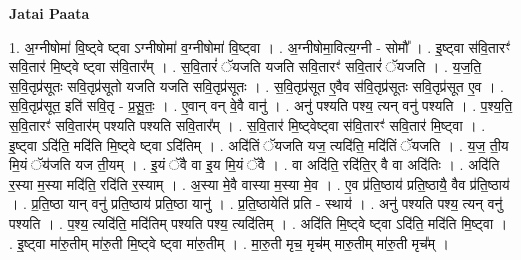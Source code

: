 \documentclass[17pt]{extarticle}
\begin{document}
\textbf{Jatai Paata} \newline

1. अ॒ग्नीषोमा॑ वि॒ष्ट्वे ष्ट्वा ऽग्नीषोमा॑ व॒ग्नीषोमा॑ वि॒ष्ट्वा । . अ॒ग्नीषोमा॒वित्य॒ग्नी - सोमौ᳚ । . इ॒ष्ट्वा स॑वि॒तारꣳ॑ सवि॒तार॑ मि॒ष्ट्वे ष्ट्वा स॑वि॒तार᳚म् । . स॒वि॒तारं॑ ॅयजति यजति सवि॒तारꣳ॑ सवि॒तारं॑ ॅयजति । . य॒ज॒ति॒ स॒वि॒तृप्र॑सूतः सवि॒तृप्र॑सूतो यजति यजति सवि॒तृप्र॑सूतः । . स॒वि॒तृप्र॑सूत ए॒वैव स॑वि॒तृप्र॑सूतः सवि॒तृप्र॑सूत ए॒व । . स॒वि॒तृप्र॑सूत॒ इति॑ सवि॒तृ - प्र॒सू॒तः॒ । . ए॒वान् वन् वे॒वै वानु॑ । . अनु॑ पश्यति पश्य॒ त्यन् वनु॑ पश्यति । . प॒श्य॒ति॒ स॒वि॒तारꣳ॑ सवि॒तार॑म् पश्यति पश्यति सवि॒तार᳚म् । . स॒वि॒तार॑ मि॒ष्ट्वेष्ट्वा स॑वि॒तारꣳ॑ सवि॒तार॑ मि॒ष्ट्वा । . इ॒ष्ट्वा ऽदि॑ति॒ मदि॑ति मि॒ष्ट्वे ष्ट्वा ऽदि॑तिम् । . अदि॑तिं ॅयजति यज॒ त्यदि॑ति॒ मदि॑तिं ॅयजति । . य॒ज॒ ती॒य मि॒यं ॅय॑जति यज ती॒यम् । . इ॒यं ॅवै वा इ॒य मि॒यं ॅवै । . वा अदि॑ति॒ रदि॑ति॒र् वै वा अदि॑तिः । . अदि॑ति र॒स्या म॒स्या मदि॑ति॒ रदि॑ति र॒स्याम् । . अ॒स्या मे॒वै वास्या म॒स्या मे॒व । . ए॒व प्र॑ति॒ष्ठाय॑ प्रति॒ष्ठायै॒ वैव प्र॑ति॒ष्ठाय॑ । . प्र॒ति॒ष्ठा यान् वनु॑ प्रति॒ष्ठाय॑ प्रति॒ष्ठा यानु॑ । . प्र॒ति॒ष्ठायेति॑ प्रति - स्थाय॑ । . अनु॑ पश्यति पश्य॒ त्यन् वनु॑ पश्यति । . प॒श्य॒ त्यदि॑ति॒ मदि॑तिम् पश्यति पश्य॒ त्यदि॑तिम् । . अदि॑ति मि॒ष्ट्वे ष्ट्वा ऽदि॑ति॒ मदि॑ति मि॒ष्ट्वा । . इ॒ष्ट्वा मा॑रु॒तीम् मा॑रु॒ती मि॒ष्ट्वे ष्ट्वा मा॑रु॒तीम् । . मा॒रु॒ती मृच॒ मृच॑म् मारु॒तीम् मा॑रु॒ती मृच᳚म् । \newline
\end{document}
